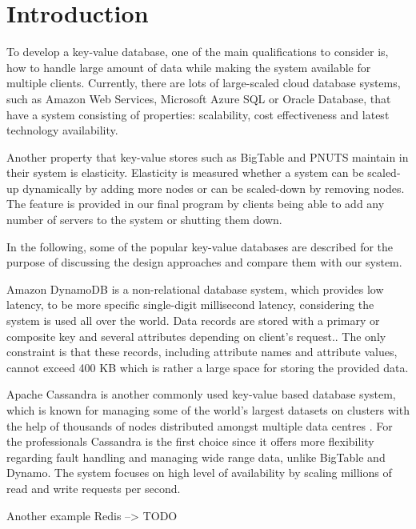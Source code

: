 \section{Introduction}
\label{sec:introduction}

To develop a key-value database, one of the main qualifications to consider is, how to handle large amount of data while making the system available for multiple clients. Currently, there are lots of large-scaled cloud database systems, such as Amazon Web Services, Microsoft Azure SQL or Oracle Database, that have a system consisting of properties: scalability, cost effectiveness and latest technology availability. 

Another property that key-value stores such as BigTable and PNUTS maintain in their system is elasticity. Elasticity is measured whether a system can be scaled-up dynamically by adding more nodes or can be scaled-down by removing nodes\cite{agrawal2011database}. The feature is provided in our final program by clients being able to add any number of servers to the system or shutting them down.

In the following, some of the popular key-value databases are described for the purpose of  discussing the design approaches and compare them with our system.

Amazon DynamoDB is a non-relational database system, which provides low latency, to be more specific single-digit millisecond latency\cite{amazon}, considering the system is used all over the world. Data records are stored with a primary or composite key and several attributes depending on client's request.\cite{requestkalid2017big}. The only constraint is that these records, including attribute names and attribute values, cannot exceed 400 KB which is rather a large space for storing the provided data\cite{amazon}.

Apache Cassandra is another commonly used key-value based database system, which is known for managing some of the world's largest datasets on clusters with the help of thousands of nodes distributed amongst multiple data centres \cite{chebotko2015big}. For the professionals Cassandra is the first choice since it offers more flexibility regarding fault handling and managing wide range data, unlike BigTable and Dynamo\cite{kalid2017big}. The system focuses on high level of availability by scaling millions of read and write requests per second.

Another example Redis --> TODO \cite{paksula2010persisting}

